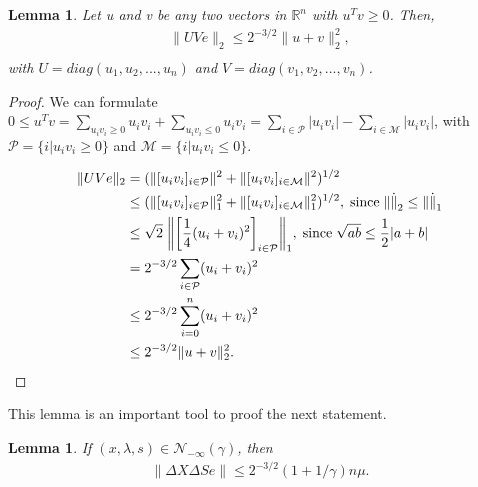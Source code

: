 \documentclass[a4paper,10 pt,titlepage,twoside]{book}
\theoremstyle{plain}
\newtheorem{lem}[thm]{Lemma}
\theoremstyle{definition}
\theoremstyle{remark}
\begin{document}
\begin{lem}\label{lem1}
	Let u and v be any two vectors in $\mathbb{R}^{n}$ with $u^{T}v \geq 0$. Then, 
\begin{align*}
\lVert UVe \rVert_{2}\leq 2^{-3/2}\lVert u + v \rVert^{2}_{2},\\
\end{align*}
with $U = diag(u_{1}, u_{2}, ..., u_{n})$ and $V = diag(v_{1}, v_{2}, ..., v_{n})$. 
\end{lem}
\begin{proof}
	We can formulate $0 \leq u^{T}v = \sum\limits_{u_{i}v_{i} \geq 0}u_{i}v_{i} + \sum\limits_{u_{i}v_{i} \leq 0}u_{i}v_{i} = \sum\limits_{i \in \mathcal{P}}|u_{i}v_{i}| - \sum\limits_{i \in \mathcal{M}}|u_{i}v_{i}| $, with $\mathcal{P}= \{i | u_{i}v_{i} \geq 0\}$ and $\mathcal{M}= \{i | u_{i}v_{i} \leq 0\}$.

\begin{align*}
\lVert UVe \rVert_{2} &= ( \lVert[u_{i}v_{i}]_{i \in \mathcal{P}} \rVert^{2} +  \lVert[u_{i}v_{i}]_{i \in \mathcal{M}} \rVert^{2})^{1/2}\\
&\leq ( \lVert[u_{i}v_{i}]_{i \in \mathcal{P}} \rVert^{2}_{1} +  \lVert[u_{i}v_{i}]_{i \in \mathcal{M}} \rVert^{2}_{1})^{1/2},\; \text{since\;} \lVert\dot\rVert_{2} \leq \lVert\dot\rVert_{1}\\
&\leq\sqrt{2}\;\bigg\lVert\bigg[\frac{1}{4}(u_{i} + v_{i})^{2}\bigg]_{i\in \mathcal{P}}\bigg\rVert_{1}, \text{\;since\;} \sqrt{ab} \leq \frac{1}{2}|a+b|\\
& = 2^{-3/2} \sum\limits_{i \in \mathcal{P}}(u_{i} + v_{i})^{2}\\
& \leq 2^{-3/2} \sum\limits_{i = 0}^{n}(u_{i} + v_{i})^{2}\\
& \leq 2^{-3/2} \lVert u + v \rVert^{2}_{2}.
\end{align*}
\end{proof}	
This lemma is an important tool to proof the next statement.
\begin{lem}
	If $(x, \lambda, s) \in \mathcal{N}_{-\infty}(\gamma)$, then
	\begin{align*}
	\lVert\Delta X\Delta S e \rVert \leq 2^{-3/2}(1 + 1/ \gamma)n\mu.\\
	\end{align*}
\end{lem}
\end{document}

